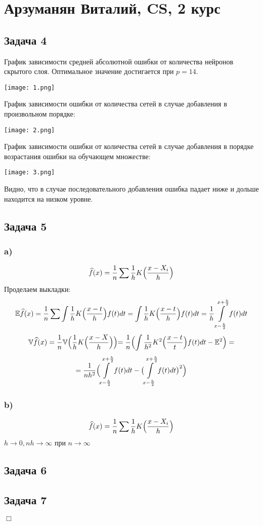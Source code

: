 \documentclass[12pt]{article}
\begin{document}
\section*{Арзуманян Виталий, CS, 2 курс}

\subsection*{Задача 4}
График зависимости средней абсолютной ошибки от количества нейронов скрытого слоя. Оптимальное значение достигается при $p=14$.

\texttt{[image: 1.png]}

График зависимости ошибки от количества сетей в случае добавления в произвольном порядке:

\texttt{[image: 2.png]}

График зависимости ошибки от количества сетей в случае добавления в порядке возрастания ошибки на обучающем множестве:

\texttt{[image: 3.png]}

Видно, что в случае последовательного добавления ошибка падает ниже и дольше находится на низком уровне.

\subsection*{Задача 5}
\subsubsection*{a)}
$$\widehat{f}(x) = \frac{1}{n}\sum\frac{1}{h}K\Bigl(\frac{x - X_i}{h}\Bigr)$$
Проделаем выкладки:
$$\mathbb{E}\widehat{f}(x) = \frac{1}{n} \sum \int \frac{1}{h} K\Bigl(\frac{x-t}{h}\Bigr)f(t)dt = \int \frac{1}{h} K \Bigl( \frac{x - t}{h} \Bigr) f(t)dt = \frac{1}{h}\int\limits_{x - \frac{h}{2}}^{x + \frac{h}{2}}f(t)dt$$
$$\mathbb{V}\widehat{f}(x) = \frac{1}{n} \mathbb{V}\Bigl(\frac{1}{h}K\Bigl(\frac{x - X}{h}\Bigl)\Bigl) = \frac{1}{n} \Bigl( \int\frac{1}{h^2} K^2\Bigl(\frac{x - t}{t} \Bigr)f(t)dt - \mathbb{E}^2 \Bigr) =$$
$$= \frac{1}{nh^2} \Bigl( \int\limits_{x - \frac{h}{2}}^{x + \frac{h}{2}} f(t)dt - \bigl( \int\limits_{x - \frac{h}{2}}^{x + \frac{h}{2}} f(t)dt \bigr)^2 \Bigr)$$

\subsubsection*{b)}
$$\widehat{f}(x) = \frac{1}{n}\sum\frac{1}{h}K\Bigl(\frac{x - X_i}{h}\Bigr)$$
$h\to0, nh\to\infty$ при $n\to\infty$




\subsection*{Задача 6}


\subsection*{Задача 7}



\begin{flushright}
$\Box$
\end{flushright}
\end{document}
